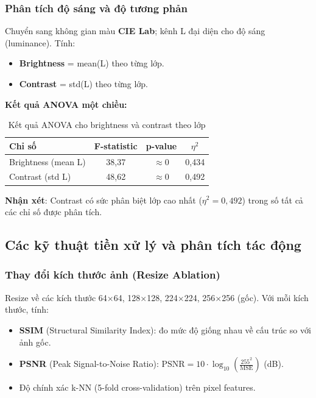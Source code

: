 \documentclass[12pt,a4paper]{article}
\let\oldtextbf\textbf
\renewcommand{\textbf}[1]{\oldtextbf{\textcolor{hcmublue}{#1}}}
\begin{document}
\subsubsection{Phân tích độ sáng và độ tương phản}

Chuyển sang không gian màu \textbf{CIE Lab}; kênh L đại diện cho độ sáng (luminance). Tính:
\begin{itemize}
    \item \textbf{Brightness} = mean(L) theo từng lớp.
    \item \textbf{Contrast} = std(L) theo từng lớp.
\end{itemize}

\textbf{Kết quả ANOVA một chiều:}
\begin{table}[H]
\centering
\begin{tabular}{|l|c|c|c|}
\hline
\textbf{Chỉ số} & \textbf{F-statistic} & \textbf{p-value} & \textbf{$\eta^2$} \\ \hline
Brightness (mean L) & 38,37 & $\approx 0$ & 0,434 \\ \hline
Contrast (std L) & 48,62 & $\approx 0$ & 0,492 \\ \hline
\end{tabular}
\caption{Kết quả ANOVA cho brightness và contrast theo lớp}
\label{tab:img_anova_bc}
\end{table}

\textbf{Nhận xét}: Contrast có sức phân biệt lớp cao nhất ($\eta^2 = 0{,}492$) trong số tất cả các chỉ số được phân tích.

\subsection{Các kỹ thuật tiền xử lý và phân tích tác động}

\subsubsection{Thay đổi kích thước ảnh (Resize Ablation)}

Resize về các kích thước 64$\times$64, 128$\times$128, 224$\times$224, 256$\times$256 (gốc). Với mỗi kích thước, tính:
\begin{itemize}
    \item \textbf{SSIM} (Structural Similarity Index): đo mức độ giống nhau về cấu trúc so với ảnh gốc.
    \item \textbf{PSNR} (Peak Signal-to-Noise Ratio): $\text{PSNR} = 10\cdot\log_{10}\!\!\left(\frac{255^2}{\text{MSE}}\right)$ (dB).
    \item Độ chính xác k-NN (5-fold cross-validation) trên pixel features.
\end{itemize}
\end{document}
